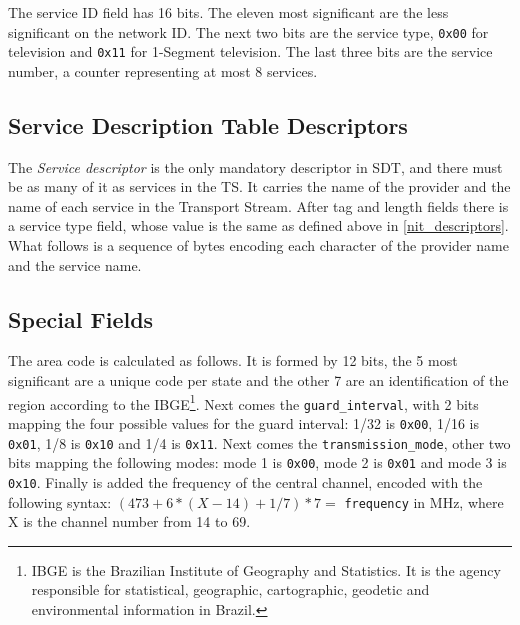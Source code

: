 \documentclass[
	12pt,				%
	openright,			%
	twoside,			%
	a4paper,			%
	brazil,
	french,				%
	english
	]{abntex2}
\begin{document}
The service ID field has 16 bits. The eleven most significant are the less significant on the network ID. The next two bits are the service type, \texttt{0x00} for television and \texttt{0x11} for 1-Segment television. The last three bits are the service number, a counter representing at most 8 services.

\subsection{Service Description Table Descriptors}
\label{sdt_descriptors}

The \textit{Service descriptor} is the only mandatory descriptor in SDT, and there must be as many of it as services in the TS. It carries the name of the provider and the name of each service in the Transport Stream. After tag and length fields there is a service type field, whose value is the same as defined above in \autoref {nit_descriptors}. What follows is a sequence of bytes encoding each character of the provider name and the service name.

\subsection{Special Fields}
\label{special_fields}

The area code is calculated as follows. It is formed by 12 bits, the 5 most significant are a unique code per state and the other 7 are an identification of the region according to the IBGE\footnote{IBGE is the Brazilian Institute of Geography and Statistics. It is the agency responsible for statistical, geographic, cartographic, geodetic and environmental information in Brazil.}. Next comes the \texttt{guard\hspace{0.1mm}\_\hspace{0.1mm}interval}, with 2 bits mapping the four possible values for the guard interval: 1/32 is \texttt{0x00}, 1/16 is \texttt{0x01}, 1/8 is \texttt{0x10} and 1/4 is \texttt{0x11}.  Next comes the \texttt{transmission\hspace{0.1mm}\_\hspace{0.1mm}mode}, other two bits mapping the following modes: mode 1 is \texttt{0x00}, mode 2 is \texttt{0x01} and mode 3 is \texttt{0x10}. Finally is added the frequency of the central channel, encoded with the following syntax: $(473 + 6 * (X - 14) + 1/7) * 7 = $ \texttt{frequency} in MHz, where X is the channel number from 14 to 69.
\end{document}
